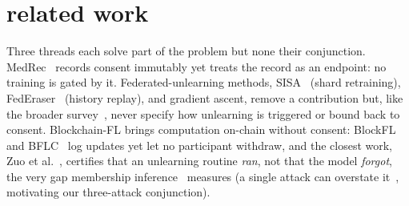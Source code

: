 \vspace{-0.3cm}
\section{related work}
\label{sec:related}

\vspace{-0.3cm}
Three threads each solve part of the problem but none their conjunction.
MedRec~\cite{azaria2016medrec} records consent
immutably yet treats the record as an endpoint: no training is gated by
it. Federated-unlearning methods, SISA~\cite{bourtoule2021sisa} (shard
retraining), FedEraser~\cite{liu2021federaser} (history replay), and
gradient ascent, remove a contribution but, like the broader
survey~\cite{romandini2024fusurvey}, never specify how unlearning is
triggered or bound back to consent. Blockchain-FL brings computation
on-chain without consent: BlockFL~\cite{kim2020blockchained} and
BFLC~\cite{li2020bflc} log updates yet let no participant withdraw, and
the closest work, Zuo et al.~\cite{zuo2024blockchain}, certifies that an
unlearning routine \emph{ran}, not that the model \emph{forgot}, the very
gap membership
inference~\cite{shokri2017mia,carlini2022lira,choquettechoo2021labelonly}
measures (a single attack can overstate it~\cite{hayes2024inexact},
motivating our three-attack conjunction).

\vspace{-0.4cm}
\begin{table}[!htbp]
\centering
\caption{Prior work across the four contribution dimensions plus cost.
\emph{Consent} = gates training (not merely recorded); \emph{Verify} =
measures forgetting (not merely records the action); \emph{Partial} =
recorded but not enforced or measured.}
\vspace{-0.3cm}
\label{tab:related}
\footnotesize
\setlength{\tabcolsep}{4pt}
\end{table}

